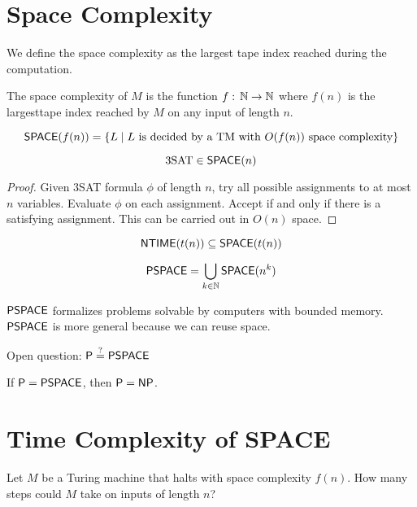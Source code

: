 \section{Space Complexity}

We define the space complexity as the largest tape index reached during the computation.

\begin{definition}
    The space complexity of $M$ is the function $f:\, \mathbb{N} \to \mathbb{N}$ where $f(n)$ is the largesttape index reached by $M$ on any input of length $n$.
\end{definition}

\begin{definition}
     $$
     \mathsf{SPACE}(f(n)) = \{ L \mid \text{$L$ is decided by a TM with $O(f(n))$ space complexity}\}
     $$ 
\end{definition}

\begin{theorem}
    $$
    \text{3SAT} \in \mathsf{SPACE}(n)
    $$
\end{theorem}

\begin{proof}
    Given 3SAT formula $\phi$ of length $n$, try all possible assignments to at most $n$ variables. Evaluate $\phi$ on each assignment. Accept if and only if there is a satisfying assignment. This can be carried out in $O(n)$ space.
\end{proof}

\begin{theorem}
    $$
    \mathsf{NTIME}(t(n)) \subseteq \mathsf{SPACE}(t(n))
    $$
\end{theorem}

\begin{definition}[PSPACE]
    $$
    \mathsf{PSPACE} = \bigcup_{k \in \mathbb{N}} \mathsf{SPACE}(n^k)
    $$
\end{definition}

$\mathsf{PSPACE}$ formalizes problems solvable by computers with bounded memory. $\mathsf{PSPACE}$ is more general because we can reuse space.

Open question: $\mathsf{P} \overset{?}{=} \mathsf{PSPACE}$

If $\mathsf{P} = \mathsf{PSPACE}$, then $\mathsf{P} = \mathsf{NP}$. 

\section{Time Complexity of SPACE}

Let $M$ be a Turing machine that halts with space complexity $f(n)$. How many steps could $M$ take on inputs of length $n$?

